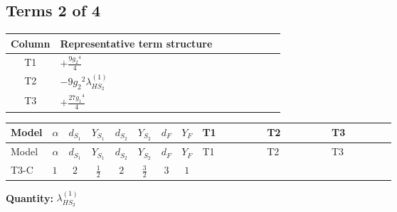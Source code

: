 \documentclass[8pt]{article}
\begin{document}
\begin{landscape}
\subsection*{Terms 2 of 4}
\begin{center}
\begin{tabular}{@{}c >{\raggedright\arraybackslash}p{0.82\linewidth}@{}}
\toprule
Column & Representative term structure \\
\midrule
T1 & \(\displaystyle +\frac{9 {g_2}^4}{4}\) \\
\midrule
T2 & \(\displaystyle -9 {g_2}^2 {\lambda_{HS_2}^{(1)}}\) \\
\midrule
T3 & \(\displaystyle +\frac{27 {g_1}^4}{4}\) \\
\midrule
\bottomrule
\end{tabular}
\end{center}
\smallskip
\tiny
\begin{longtable}{@{}llcccccc >{\raggedright\arraybackslash}p{0.21\linewidth} >{\raggedright\arraybackslash}p{0.21\linewidth} >{\raggedright\arraybackslash}p{0.21\linewidth}@{}}
\toprule
Model & $\alpha$ & $d_{S_1}$ & $Y_{S_1}$ & $d_{S_2}$ & $Y_{S_2}$ & $d_F$ & $Y_F$ & T1 & T2 & T3 \\
\midrule
\endfirsthead
\toprule
Model & $\alpha$ & $d_{S_1}$ & $Y_{S_1}$ & $d_{S_2}$ & $Y_{S_2}$ & $d_F$ & $Y_F$ & T1 & T2 & T3 \\
\midrule
\endhead
T3-C & $1$ & $2$ & $\frac{1}{2}$ & $2$ & $\frac{3}{2}$ & $3$ & $1$ & \scriptsize\adjustbox{max width=\linewidth}{$\begin{gathered} +\frac{9 {g_2}^4}{4}\end{gathered}$} & \scriptsize\adjustbox{max width=\linewidth}{$\begin{gathered} -9 {g_2}^2 {\lambda_{HS_2}^{(1)}}\end{gathered}$} & \scriptsize\adjustbox{max width=\linewidth}{$\begin{gathered} +\frac{27 {g_1}^4}{4}\end{gathered}$} \\
\midrule
\bottomrule
\end{longtable}
\clearpage
\noindent\textbf{Quantity: }$\lambda_{HS_2}^{(1)}$\par\smallskip

\end{landscape}
\end{document}
